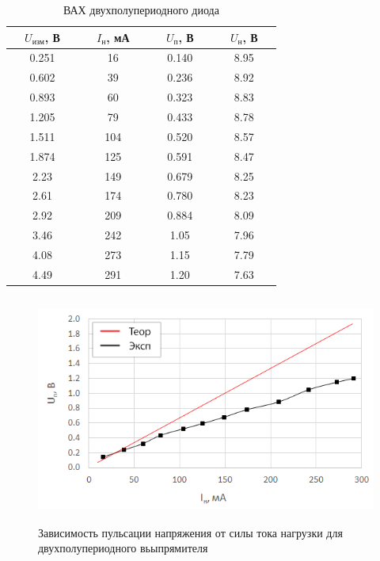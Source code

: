 \begin{table}[H]
	\begin{center}
	\caption{ВАХ двухполупериодного диода}
	\def\arraystretch{1.0}
		\begin{tabular}{|c|c|c|c|}
		\hline 
		\ \ $U_\text{изм}$, В\ \  & \ \ $I_\text{н}$, мА\ \  & \ \ $U_\text{п}$, В\ \  & \ \ $U_\text{н}$, В\ \  \\ \hline
		0.251 & 16 & 0.140 & 8.95 \\ \hline
		0.602 & 39 & 0.236 & 8.92 \\ \hline
		0.893 & 60 & 0.323 & 8.83 \\ \hline
		1.205 & 79 & 0.433 & 8.78 \\ \hline
		1.511 & 104 & 0.520 & 8.57 \\ \hline
		1.874 & 125 & 0.591 & 8.47 \\ \hline
		2.23 & 149 & 0.679 & 8.25 \\ \hline
		2.61 & 174 & 0.780 & 8.23 \\ \hline
		2.92 & 209 & 0.884 & 8.09 \\ \hline
		3.46 & 242 & 1.05 & 7.96 \\ \hline
		4.08 & 273 & 1.15 & 7.79 \\ \hline
		4.49 & 291 & 1.20 & 7.63 \\ \hline
		\end{tabular} 
		\label{tab:5:3}
	\end{center}
\end{table}

\begin{figure}[H]
	\begin{center}
		\includegraphics[height=7.5cm]{img/4}
		\caption{Зависимость пульсации напряжения от силы тока нагрузки для двухполупериодного вьыпрямителя}
		\label{g:4} %
	\end{center}
\end{figure}

